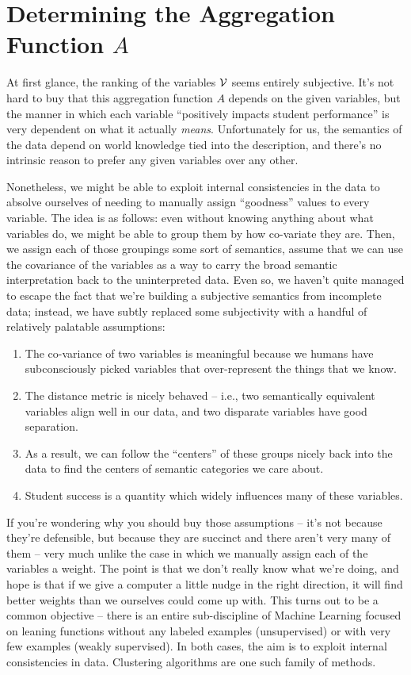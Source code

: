 \documentclass[paper.tex]{subfiles}
\begin{document}
	\section{Determining the Aggregation Function $A$}
	
	At first glance, the ranking of the variables $\mathcal{V}$ seems entirely subjective. It's not hard to buy that this aggregation function $A$ depends on the given variables, but the manner in which each variable ``positively impacts student performance'' is very dependent on what it actually \emph{means}. Unfortunately for us, the semantics of the data depend on world knowledge tied into the description, and there's no intrinsic reason to prefer any given variables over any other.
	
	Nonetheless, we might be able to exploit internal consistencies in the data to absolve ourselves of needing to manually assign ``goodness'' values to every variable. The idea is as follows: even without knowing anything about what variables do, we might be able to group them by how co-variate they are. Then, we assign each of those groupings some sort of semantics, assume that we can use the covariance of the variables as a way to carry the broad semantic interpretation back to the uninterpreted data. Even so, we haven't quite managed to escape the fact that we're building a subjective semantics from incomplete data; instead, we have subtly replaced some subjectivity with a handful of relatively palatable assumptions: 
	\begin{enumerate}[itemsep=-0.5em]
		\item The co-variance of two variables is meaningful because we humans have subconsciously picked variables that over-represent the things that we know.
		\item The distance metric is nicely behaved -- i.e., two semantically equivalent variables align well in our data, and two disparate variables have good separation.
		\item As a result, we can follow the ``centers'' of these groups nicely back into the data to find the centers of semantic categories we care about.
		\item Student success is a quantity which widely influences many of these variables.
	\end{enumerate} 
	If you're wondering why you should buy those assumptions -- it's not because they're defensible, but because they are succinct and there aren't very many of them -- very much unlike the case in which we manually assign each of the variables a weight. The point is that we don't really know what we're doing, and hope is that if we give a computer a little nudge in the right direction, it will find better weights than we ourselves could come up with. This turns out to be a common objective -- there is an entire sub-discipline of Machine Learning focused on leaning functions without any labeled examples (unsupervised) or with very few examples (weakly supervised). In both cases, the aim is to exploit internal consistencies in data. Clustering algorithms are one such family of methods.
	
\end{document}
